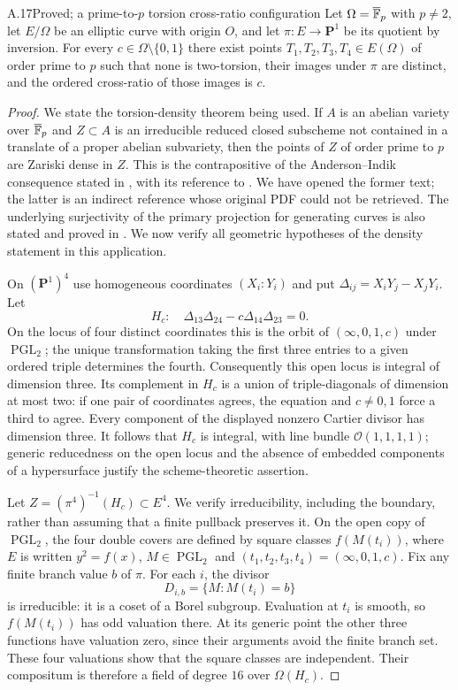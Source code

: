\begin{claim}{A.17}{Proved; a prime-to-$p$ torsion cross-ratio configuration}
Let $\Omega=\overline{\mathbb F}_p$ with $p\ne2$, let $E/\Omega$ be
an elliptic curve with origin $O$, and let
$\pi:E\to\mathbf P^1$ be its quotient by inversion. For every
$c\in\Omega\setminus\{0,1\}$ there exist points
$T_1,T_2,T_3,T_4\in E(\Omega)$ of order prime to $p$ such that
none is two-torsion, their images under $\pi$ are distinct,
and the ordered cross-ratio of those images is $c$.
\end{claim}
\begin{proof}
We state the torsion-density theorem being used. If $A$ is an
abelian variety over $\overline{\mathbb F}_p$ and $Z\subset A$ is an
irreducible reduced closed subscheme not contained in a
translate of a proper abelian subvariety, then the points of
$Z$ of order prime to $p$ are Zariski dense in $Z$. This is the
contrapositive of the Anderson--Indik consequence stated in
\citet[Proposition 2.3, p.~5]{A_Yang2016}, with its reference to
\citet[p.~704]{A_Tamagawa2004}. We have opened the former text;
the latter is an indirect reference whose original PDF could
not be retrieved. The underlying surjectivity of the primary
projection for generating curves is also stated and proved in
\citet[Theorem 1.1]{A_BogomolovTschinkel2005}. We now verify all
geometric hypotheses of the density statement in this
application.

On $(\mathbf P^1)^4$ use homogeneous coordinates $(X_i:Y_i)$
and put $\Delta_{ij}=X_iY_j-X_jY_i$. Let
\[
 H_c:\quad\Delta_{13}\Delta_{24}
                   -c\Delta_{14}\Delta_{23}=0.
\]
On the locus of four distinct coordinates this is the orbit
of $(\infty,0,1,c)$ under $\operatorname{PGL}_2$; the unique
transformation taking the first three entries to a given
ordered triple determines the fourth. Consequently this open
locus is integral of dimension three. Its complement in $H_c$
is a union of triple-diagonals of dimension at most two: if
one pair of coordinates agrees, the equation and $c\ne0,1$
force a third to agree. Every component of the displayed
nonzero Cartier divisor has dimension three. It follows that
$H_c$ is integral, with line bundle
$\mathcal O(1,1,1,1)$; generic reducedness on the open locus
and the absence of embedded components of a hypersurface
justify the scheme-theoretic assertion.

Let $Z=(\pi^4)^{-1}(H_c)\subset E^4$. We verify irreducibility,
including the boundary, rather than assuming that a finite
pullback preserves it. On the open copy of
$\operatorname{PGL}_2$, the four double covers are defined by
square classes $f(M(t_i))$, where $E$ is written $y^2=f(x)$,
$M\in\operatorname{PGL}_2$ and
$(t_1,t_2,t_3,t_4)=(\infty,0,1,c)$. Fix any finite branch
value $b$ of $\pi$. For each $i$, the divisor
\[
 D_{i,b}=\{M:M(t_i)=b\}
\]
is irreducible: it is a coset of a Borel subgroup. Evaluation
at $t_i$ is smooth, so $f(M(t_i))$ has odd valuation there.
At its generic point the other three functions have valuation
zero, since their arguments avoid the finite branch set.
These four valuations show that the square classes are
independent. Their compositum is therefore a field of degree
$16$ over $\Omega(H_c)$.


\end{proof}
